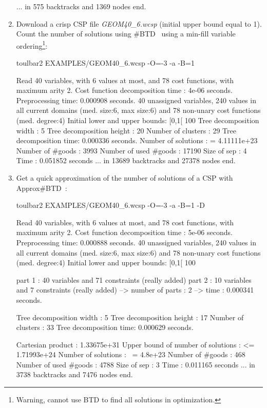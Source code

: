 \begin{enumerate}
{\begin{DoxyCode}
... in 575 backtracks and 1369 nodes
end.
\end{DoxyCode}}
\item Download a crisp CSP file {\em GEOM40\_6.wcsp} (initial upper bound equal to 1). Count the number of solutions using \#BTD~\cite{Favier09a} using a min-fill variable ordering\footnote{Warning, cannot use BTD to find all solutions in optimization.}:
\begin{DoxyCode}
	toulbar2 EXAMPLES/GEOM40_6.wcsp -O=-3 -a -B=1
\end{DoxyCode}
{\scriptsize
\begin{DoxyCode}
Read 40 variables, with 6 values at most, and 78 cost functions, with maximum arity 2.
Cost function decomposition time : 4e-06 seconds.
Preprocessing time: 0.000908 seconds.
40 unassigned variables, 240 values in all current domains (med. size:6, max size:6) and 78 non-unary cost functions (med. degree:4)
Initial lower and upper bounds: [0,1[ 100%
Tree decomposition width  : 5
Tree decomposition height : 20
Number of clusters        : 29
Tree decomposition time: 0.000336 seconds.
Number of solutions    : =  4.11111e+23
Number of #goods       :    3993
Number of used #goods  :    17190
Size of sep            :    4
Time                   :    0.051852 seconds
... in 13689 backtracks and 27378 nodes
end.
\end{DoxyCode}}
\item Get a quick approximation of the number of solutions of a CSP with Approx\#BTD~\cite{Favier09a}:
\begin{DoxyCode}
	toulbar2 EXAMPLES/GEOM40_6.wcsp -O=-3 -a -B=1 -D
\end{DoxyCode}
{\scriptsize
\begin{DoxyCode}
Read 40 variables, with 6 values at most, and 78 cost functions, with maximum arity 2.
Cost function decomposition time : 5e-06 seconds.
Preprocessing time: 0.000888 seconds.
40 unassigned variables, 240 values in all current domains (med. size:6, max size:6) and 78 non-unary cost functions (med. degree:4)
Initial lower and upper bounds: [0,1[ 100%

part 1 : 40 variables and 71 constraints (really added)
part 2 : 10 variables and 7 constraints (really added)
--> number of parts : 2
--> time : 0.000341 seconds. 

Tree decomposition width  : 5
Tree decomposition height : 17
Number of clusters        : 33
Tree decomposition time: 0.000629 seconds.

Cartesian product 		   :    1.33675e+31
Upper bound of number of solutions : <= 1.71993e+24
Number of solutions    : ~= 4.8e+23
Number of #goods       :    468
Number of used #goods  :    4788
Size of sep            :    3
Time                   :    0.011165 seconds
... in 3738 backtracks and 7476 nodes
end.
\end{DoxyCode}}
\end{enumerate}
